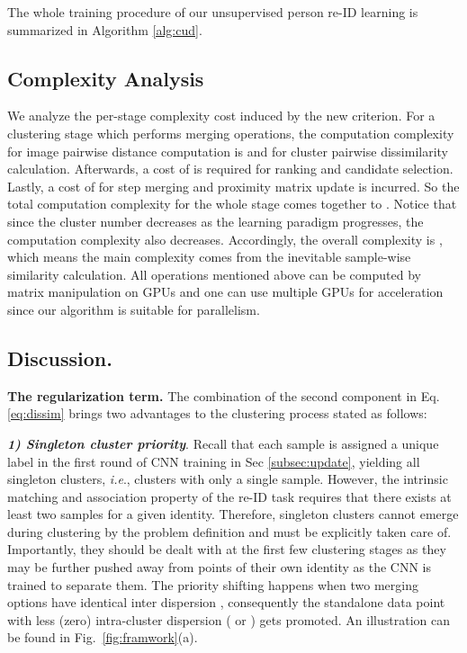 \documentclass[journal]{IEEEtran}
\newcommand{\ie}{\textit{i.e}.}
\begin{document}
The whole training procedure of our unsupervised person re-ID learning is summarized in Algorithm \ref{alg:cud}.

\subsection{Complexity Analysis} We analyze the per-stage complexity cost induced by the new criterion. For a clustering stage which performs  merging operations, the computation complexity for image pairwise distance computation is  and  for cluster pairwise dissimilarity calculation. Afterwards, a cost of  is required for ranking and candidate selection. Lastly, a cost of  for  step merging and proximity matrix update is incurred. So the total computation complexity for the whole stage comes together to . Notice that since the cluster number  decreases as the learning paradigm progresses, the computation complexity also decreases. Accordingly, the overall complexity is , which means the main complexity comes from the inevitable sample-wise similarity calculation. All operations mentioned above can be computed by matrix manipulation on GPUs and one can use multiple GPUs for acceleration since our algorithm is suitable for parallelism.

\subsection{Discussion.} 

\textbf{The regularization term.}
The combination of the second component in Eq. \eqref{eq:dissim} brings two advantages to the clustering process stated as follows:

\textbf{{\em 1) Singleton cluster priority}}. Recall that each sample is assigned a unique label in the first round of CNN training in Sec \ref{subsec:update}, yielding all singleton clusters, \ie, clusters with only a single sample. However, the intrinsic matching and association property of the re-ID task requires that there exists at least two samples for a given identity. Therefore, singleton clusters cannot emerge during clustering by the problem definition and must be explicitly taken care of. Importantly, they should be dealt with at the first few  clustering stages as they may be further pushed away from points of their own identity as the CNN is trained to separate them. The priority shifting happens when two merging options have identical inter dispersion , consequently the standalone data point with less (zero) intra-cluster dispersion ( or ) gets promoted. An illustration can be found in Fig.~\ref{fig:framwork}(a). 
\end{document}
